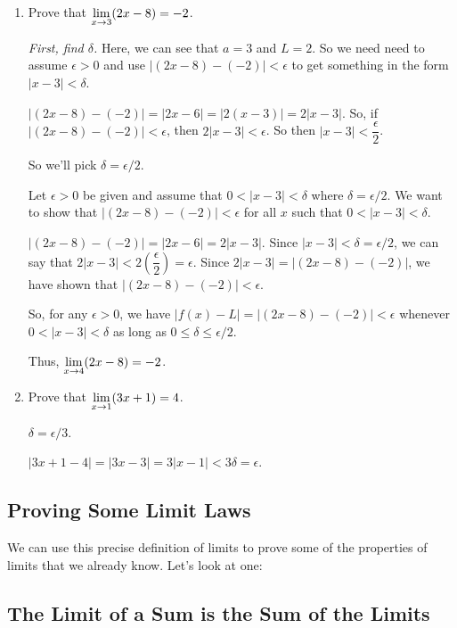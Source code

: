 \begin{enumerate}
  \item Prove that $\displaystyle \lim_{x\to3}(2x-8)=-2$.

  \textit{First, find $\delta$.}
  Here, we can see that $a=3$ and $L=2$.
  So we need need to assume $\epsilon>0$ and use $|(2x-8)-(-2)|<\epsilon$ to get something in the form $|x-3|<\delta$.

  $|(2x-8)-(-2)| = |2x-6| = |2(x-3)| = 2|x-3|$.
  So, if $|(2x-8)-(-2)|<\epsilon$, then $2|x-3|<\epsilon$.
  So then $|x-3|<\dfrac{\epsilon}{2}$.

  So we'll pick $\delta=\epsilon/2$.

  \begin{prf}{}
    Let $\epsilon>0$ be given and assume that $0<|x-3|<\delta$ where $\delta=\epsilon/2$.
    We want to show that $|(2x-8)-(-2)|<\epsilon$ for all $x$ such that $0<|x-3|<\delta$.

    $|(2x-8)-(-2)| = |2x-6| = 2|x-3|$.
    Since $|x-3|<\delta = \epsilon/2$, we can say that $2|x-3|<2\left(\dfrac{\epsilon}{2}\right) = \epsilon$.
    Since $2|x-3| = |(2x-8)-(-2)|$, we have shown that $|(2x-8)-(-2)|<\epsilon$.

    So, for any $\epsilon>0$, we have $|f(x)-L| = |(2x-8)-(-2)|<\epsilon$ whenever $0<|x-3|<\delta$ as long as $0\leq\delta\leq\epsilon/2$.

    Thus, $\displaystyle \lim_{x\to 4} (2x-8)=-2$.
  \end{prf}


  \item Prove that $\displaystyle \lim_{x\to1}(3x+1)=4$.

  $\delta = \epsilon/3$.

  \begin{prf}{}
    $|3x+1-4|=|3x-3|=3|x-1|<3\delta = \epsilon$.
  \end{prf}
  \end{enumerate}

\subsection*{Proving Some Limit Laws}

We can use this precise definition of limits to prove some of the properties of limits that we already know.
Let's look at one:

\subsection*{The Limit of a Sum is the Sum of the Limits}

